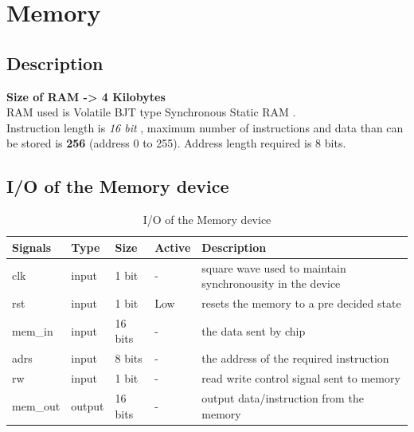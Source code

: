 \documentclass[11pt]{article}
\begin{document}
\section{Memory}
\subsection{Description}
{\bf Size of RAM -> 4 Kilobytes} \\
RAM used is Volatile BJT type Synchronous Static RAM . \\
Instruction length is \textit{16 bit} , maximum number of instructions  and data than can be stored is {\bf 256} (address 0 to 255).
Address length required is 8 bits.
\subsection{I/O of the  Memory device}

\begin{table}[H]
  \begin{center}
    \caption{I/O of the Memory device}
    \begin{tabularx}{\linewidth}{||l|l|l|l|X||}
      \hline
      {\bf Signals} & { \bf Type } & {\bf Size} & {\bf Active} &{\bf Description}   \\ \hline
            clk            & input  & 1 bit   & -     &  square wave used to maintain synchronousity in the device \\ \hline
            rst            & input  & 1 bit   & Low   &  resets the memory to a pre decided state \\ \hline
            [15:0] mem\_in & input  & 16 bits & -     &  the data sent by chip \\ \hline
            [7:0] adrs     & input  & 8 bits  & -     &  the address of the required instruction \\ \hline
            rw             & input  & 1 bit   & -     &  read write control signal sent to memory \\ \hline
            [15:0] mem\_out& output & 16 bits & -     &  output data/instruction from the memory \\ \hline
    \end{tabularx}
  \end{center}
\end{table}
\end{document}
